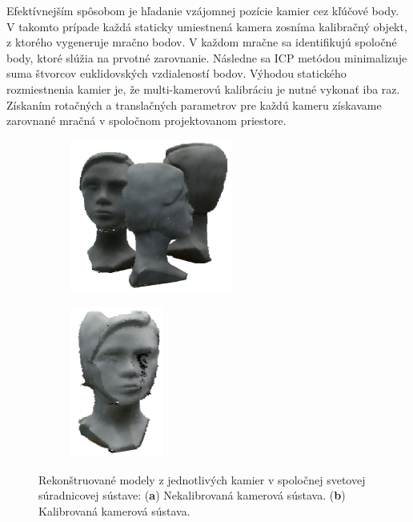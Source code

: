 Efektívnejším spôsobom je hľadanie vzájomnej pozície kamier cez kľúčové body. V takomto prípade každá staticky umiestnená kamera zosníma kalibračný objekt, z ktorého vygeneruje mračno bodov. V každom mračne sa identifikujú spoločné body, ktoré slúžia na prvotné zarovnanie. Následne sa ICP metódou minimalizuje suma štvorcov euklidovských vzdialeností bodov. Výhodou statického rozmiestnenia kamier je, že multi-kamerovú kalibráciu je nutné vykonať iba raz. Získaním rotačných a translačných parametrov pre každú kameru získavame zarovnané mračná v spoločnom projektovanom priestore. 

\begin{figure}[h]
	\centering
	\begin{subfigure}[b]{0.48\textwidth}
		\centering
		\includegraphics[height=5cm]{figures/calibration_multi_uncalib.png}
		\caption{}
		\label{fig:calib:multi:uncalib}
	\end{subfigure}
	\hfill
	\begin{subfigure}[b]{0.48\textwidth}
		\centering
		\includegraphics[height=5cm]{figures/calibration_multi_calib.png}
		\caption{}
		\label{fig:calib:haus:calib}
	\end{subfigure}
	\caption{Rekonštruované modely z jednotlivých kamier v spoločnej svetovej súradnicovej sústave: (\textbf{a}) Nekalibrovaná kamerová sústava. (\textbf{b}) Kalibrovaná kamerová sústava.}
	\label{fig:calib:multi}
\end{figure}


